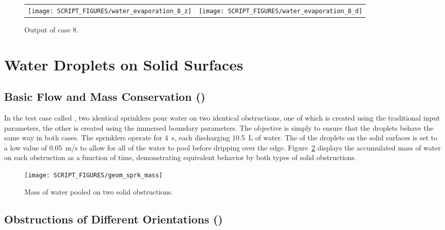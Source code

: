 \documentclass[11pt]{book}
\begin{document}
\begin{figure}[h!]
\noindent
\begin{tabular*}{\textwidth}{l@{\extracolsep{\fill}}r}
\texttt{[image: SCRIPT\_FIGURES/water\_evaporation\_8\_z]} &
\texttt{[image: SCRIPT\_FIGURES/water\_evaporation\_8\_d]}
\end{tabular*}
\caption[Sample case ]{Output of  case 8.}
\label{water_evaporation_8_plots}
\end{figure}

\FloatBarrier

\section{Water Droplets on Solid Surfaces}

\subsection{Basic Flow and Mass Conservation (\texorpdfstring{{}}{geom\_sprk\_mass}) }
\label{geom_sprk_mass}

In the test case called , two identical sprinklers pour water on two identical obstructions, one of which is created using the traditional  input parameters, the other is created using the immersed boundary  parameters. The objective is simply to ensure that the droplets behave the same way in both cases. The sprinklers operate for 4~s, each discharging 10.5~L of water. The  of the droplets on the solid surfaces is set to a low value of 0.05~m/s to allow for all of the water to pool before dripping over the edge. Figure~\ref{geom_sprk_mass_fig} displays the accumulated mass of water on each obstruction as a function of time, demonstrating equivalent behavior by both types of solid obstructions.
\begin{figure}[h!]
\centering
\texttt{[image: SCRIPT\_FIGURES/geom\_sprk\_mass]}
\caption[The  test case]{Mass of water pooled on two solid obstructions.}
\label{geom_sprk_mass_fig}
\end{figure}

\subsection{Obstructions of Different Orientations (\texorpdfstring{{}}{geom\_particle\_cascade\_2}) }
\label{geom_particle_cascade_2}
\end{document}
